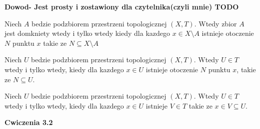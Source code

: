 \documentclass{article}
\begin{document}
\textbf{Dowod- Jest prosty i zostawiony dla czytelnika(czyli mnie) TODO}

\begin{tcolorbox}[colback=white!90!cyan,colframe=black!35!cyan,title=3.2.7 Wniosek: Otoczenie i domknietosc zbioru A]

    Niech $A$ bedzie podzbiorem przestrzeni topologicznej $(X,T)$. Wtedy zbior $A$ jest domkniety wtedy i tylko wtedy kiedy dla kazdego $x \in X\setminus A$ istnieje otoczenie $N$ punktu $x$ takie ze $N \subseteq X\setminus A$

\end{tcolorbox}

\begin{tcolorbox}[colback=white!90!cyan,colframe=black!35!cyan,title=3.2.8 Wniosek: Otoczenie i otwartosc zbioru A]

    Niech $U$ bedzie podzbiorem przestrzeni topologicznej $(X,T)$. Wtedy $U\in T$ wtedy i tylko wtedy, kiedy dla kazdego $x\in U$ istnieje otoczenie $N$ punktu $x$, takie ze $N\subseteq U$.

\end{tcolorbox}

\begin{tcolorbox}[colback=white!90!cyan,colframe=black!35!cyan,title=3.2.9 Wniosek: Otoczenie i otwartosc zbioru A: v2]
    Niech $U$ bedzie podzbiorem przestrzeni topologicznej $(X,T)$. Wtedy $U\in T$ wtedy i tylko wtedy, kiedy dla kazdego $x\in U$ istnieje $V \in T$ takie ze $x\in V \subseteq U.$

\end{tcolorbox}



\textbf{Cwiczenia 3.2}

\hrulefill
\end{document}
